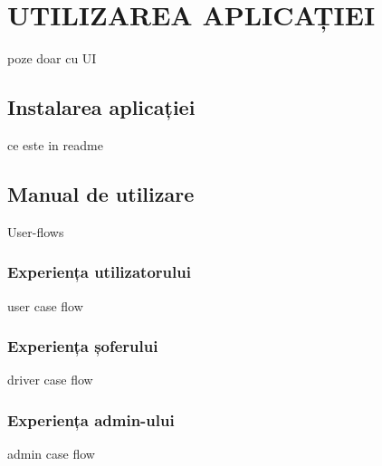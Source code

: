 \chapter{UTILIZAREA APLICAȚIEI}
poze doar cu UI
\section{Instalarea aplicației}
ce este in readme
\section{Manual de utilizare}
User-flows
\subsection{Experiența utilizatorului}
user case flow
\subsection{Experiența șoferului}
driver case flow
\subsection{Experiența admin-ului}
admin case flow